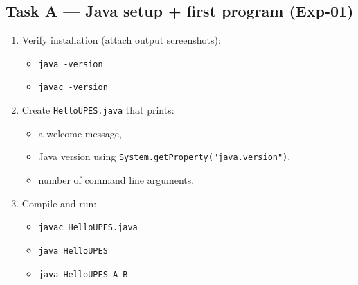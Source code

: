 \documentclass[11pt]{article}
\begin{document}
\subsection{Task A --- Java setup + first program (Exp-01)}
\begin{enumerate}[leftmargin=*]
  \item Verify installation (attach output screenshots):
  \begin{itemize}[leftmargin=*]
    \item \texttt{java -version}
    \item \texttt{javac -version}
  \end{itemize}

  \item Create \texttt{HelloUPES.java} that prints:
  \begin{itemize}[leftmargin=*]
    \item a welcome message,
    \item Java version using \texttt{System.getProperty("java.version")},
    \item number of command line arguments.
  \end{itemize}

  \item Compile and run:
  \begin{itemize}[leftmargin=*]
    \item \texttt{javac HelloUPES.java}
    \item \texttt{java HelloUPES}
    \item \texttt{java HelloUPES A B}
  \end{itemize}
\end{enumerate}
\end{document}
